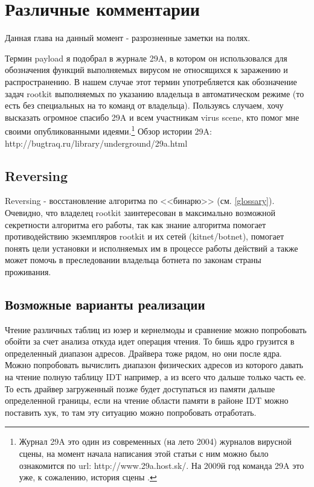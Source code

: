 \section{Различные комментарии}

Данная глава на данный момент - разрозненные заметки на полях.


\label{payload_term}

Термин payload я подобрал в журнале 29A, в котором он использовался для
обозначения функций выполняемых вирусом не относящихся к заражению и
распространению. В нашем случае этот термин употребляется как
обозначение задач rootkit выполняемых по указанию владельца в
автоматическом режиме (то  есть без специальных на то команд от
владельца). Пользуясь случаем, хочу  высказать огромное спасибо 29A и
всем участникам virus scene, кто помог мне своими опубликованными
идеями.\footnote{Журнал 29A это один из современных (на лето 2004)
журналов вирусной сцены, на момент начала написания этой статьи
с ним можно было ознакомится по url: http://www.29a.host.sk/\label{29A_mag}. На 2009й год
команда 29A это уже, к сожалению, история сцены . }
Обзор истории 29A: http://bugtraq.ru/library/underground/29a.html

\subsection{Reversing}

Reversing - восстановление алгоритма по <<бинарю>> (см. \ref{glossary}).
Очевидно, что владелец rootkit заинтересован в максимально возможной
секретности алгоритма  его работы, так как знание алгоритма помогает
противодействию экземпляров rootkit и их сетей (kitnet/botnet),
помогает понять цели установки и исполняемых им в процессе работы
действий а также может помочь в преследовании владельца ботнета
по законам страны проживания.

\subsection{Возможные варианты реализации}
Чтение различных таблиц из юзер и кернелмоды и сравнение можно попробовать обойти за счет анализа откуда
идет операция чтения. То бишь ядро грузится в определенный диапазон адресов. Драйвера тоже рядом, но они после ядра. Можно попробовать вычислить диапазон физических адресов из которого давать на чтение полную таблицу IDT например, а из всего что дальше только часть ее. То есть драйвер загруженный позже будет доступаться из памяти дальше определенной границы, если на чтение области памяти в районе IDT можно поставить хук, то там эту ситуацию
можно попробовать отработать.

